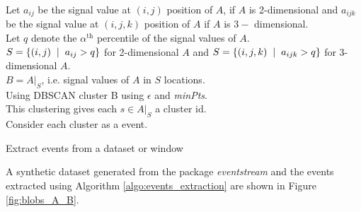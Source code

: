 \documentclass[11pt]{article}
\begin{document}
	 \DontPrintSemicolon
	 \begin{algorithm}[!ht]
	 	\footnotesize
	 	Let $a_{ij}$ be the signal value at $(i, j)$ position of $A$, if $A$ is 2-dimensional and $a_{ijk}$ be the signal value at $(i, j, k)$ position of $A$ if $A$ is  $3-$ dimensional. \\
	 	Let $q$ denote the $\alpha^{\text{th}}$ percentile of the signal values of $A$. \\
	 	$S = \{ (i,j) \hspace{2mm} | \hspace{2mm} a_{ij} > q  \} $ for 2-dimensional $A$ and 
	 	$S = \{ (i,j, k) \hspace{2mm} | \hspace{2mm} a_{ijk} > q  \} $ for 3-dimensional $A$. \\
	 	$ B = A|_S$, i.e. signal values of $A$ in $S$ locations. \\
	 	Using DBSCAN cluster B using $\epsilon$ and {\it minPts}. \\
	 	This clustering gives each $s \in A|_S$ a cluster id. \\
	 	
	 	Consider each cluster as a event. \, 
	 	\caption{\footnotesize Extract events from a dataset or window}
	 	\label{algo:events_extraction}
	 \end{algorithm}
	 
	 A synthetic dataset generated from the package {\it eventstream} and the events extracted using Algorithm \ref{algo:events_extraction} are shown in Figure \ref{fig:blobs_A_B}. 
	 
\end{document}
